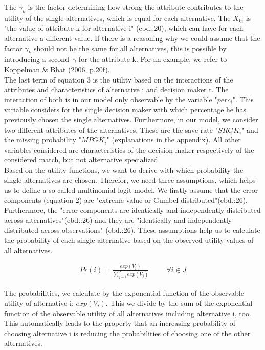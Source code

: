 \documentclass[12pt,dvipsnames]{article}%
\begin{document}
The $\gamma_k$ is the factor determining how strong the attribute contributes to the utility of the single alternatives, which is equal for each alternative. The $X_{ki}$ is "the value of attribute k for alternative i" (ebd.:20), which can have for each alternative a different value. If there is a reasoning why we could assume that the factor $\gamma_k$ should not be the same for all alternatives, this is possible by introducing a \mbox{second $\gamma$} for the attribute k. For an example, we refer to Koppelman \& Bhat (2006, p.20f).  \\
 The last term of equation 3 is the utility based on the interactions of the attributes and characteristics of alternative i and decision maker t. The interaction of both is in our model only observable by the variable "$perc_i$". This variable considers for the single decision maker with which percentage he has previously chosen the single alternatives. Furthermore, in our model, we consider two different attributes of the alternatives. These are the save rate "$SRGK_i$" and the missing probability "$MPGK_i$" (explanations in the appendix). All other variables considered are characteristics of the decision maker respectively of the considered match, but not alternative specialized. \\
%
Based on the utility functions, we want to derive with which probability the single alternatives are chosen. Therefor, we need three assumptions, which helps us to define a so-called multinomial logit model. We firstly assume that the error components (equation 2) are "extreme value or Gumbel distributed"(ebd.:26). Furthermore, the "error components are identically and independently distributed across alternatives"(ebd.:26) and they are "identically and independently distributed across observations" (ebd.:26). These assumptions help us to calculate the probability of each single alternative based on the observed utility values of all alternatives.

\vspace{-2cm}

 \begin{center}
\begin{align}
Pr(i) = \frac{exp(V_i)}{\sum_{j=i}^J exp(V_j)}  \ \ \ \ \ \ \ \ \ \ \ \forall i \in J \label{eq:test5}
\end{align}
\end{center}

The probabilities, we calculate by the exponential function of the observable utility of alternative i: $exp(V_i)$. This we divide by the sum of the exponential function of the observable utility of all alternatives including alternative i, too. This automatically leads to the property that an increasing probability of choosing alternative i is reducing the probabilities of choosing one of the other alternatives. 
\end{document}
